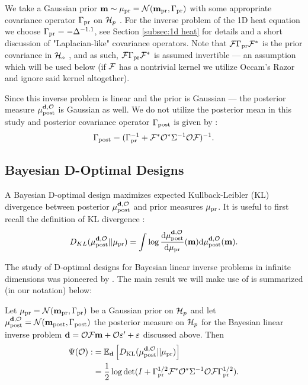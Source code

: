 We take a Gaussian prior \(\mathbf{m} \sim \mu_{\textup{pr}} = \mathcal{N}(\mathbf{m}_{\textup{pr}}
,\Gamma_{\textup{pr}})\) with some appropriate covariance operator \(\Gamma_{\textup{pr}}\) on
\(\mathcal{H}_p\) \cite{Stuart10}. For the inverse problem of the 1D heat
equation we choose $\Gamma_{\textup{pr}} = -\Delta^{-1.1}$, see Section
\ref{subsec:1d heat} for details and a short discussion of
"Laplacian-like" covariance operators. Note that \(\mathcal{F} \Gamma_{\textup{pr}}
\mathcal{F}^*\) is the prior covariance in \(\mathcal{H}_o\) \cite{Stuart10}, and as
such, \(\mathcal{F} \Gamma_{\textup{pr}} \mathcal{F}^*\) is assumed invertible --- an assumption
which will be used below (if \(\mathcal{F}\) has a nontrivial kernel we
utilize Occam's Razor and ignore said kernel altogether).

Since this inverse problem is linear and the prior is Gaussian --- the
posterior measure \(\mu_{\textup{post}}^{\mathbf{d}, \mathcal{O}}\) is Gaussian as well. We do not utilize the
posterior mean in this study and posterior covariance operator
$\Gamma_{\textup{post}}$ is given by \cite{Stuart10}:
\begin{align}\label{eq:postcov}
  \postcov = (\prcov^{-1} + \fwd^* \obs^* \Sigma^{-1} \obs \fwd
  )^{-1}.
\end{align}

\subsection{Bayesian D-Optimal Designs}\label{subsec:D optimal design} 
A Bayesian D-optimal design maximizes expected Kullback-Leibler (KL)
divergence between posterior \(\mu_{\textup{post}}^{\mathbf{d}, \mathcal{O}}\) and prior measures \(\mu_{\textup{pr}}\). It is
useful to first recall the definition of KL divergence \cite{CoverThomas91}:
\begin{equation*}
  D_{KL}(\post||\pr) = \int \log \frac{\der \post}{\der \pr}(\param) \der \post(\param).
\end{equation*}

The study of D-optimal designs for Bayesian linear inverse problems in
infinite dimensions was pioneered by \cite{AlexanderianGloorGhattas14,
  alexanderian2018efficient}. The main result we will make use of is
summarized (in our notation) below:

\begin{theorem}\label{thm:d optimality}
  Let \(\mu_{\textup{pr}} = \mathcal{N}(\mathbf{m}_{\textup{pr}},\Gamma_{\textup{pr}})\) be a Gaussian prior on \(\mathcal{H}_p\)
  and let \(\mu_{\textup{post}}^{\mathbf{d}, \mathcal{O}} = \mathcal{N}(\mathbf{m}_{\textup{post}},\Gamma_{\textup{post}})\) the posterior measure
  on \(\mathcal{H}_p\) for the Bayesian linear inverse problem \(\mathbf{d} = \mathcal{O}
  \mathcal{F}\mathbf{m} + \mathcal{O} \varepsilon' + \varepsilon\) discussed above. Then
  \begin{align}\label{eq:objective}
    \begin{split}
      \tar( \obs) :&= \mathbb{E}_{\data}\left [ D_{\text{KL}} (\post || \pr ) \right ] \\
      &= \frac12 \log \det 
      ( I + \prcov^{1/2}  \fwd ^* \obs^* \Sigma^{-1} \obs \fwd \prcov^{1/2}).
    \end{split}
  \end{align}
\end{theorem}

